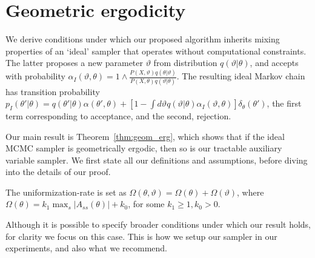 \newpage
\section{Geometric ergodicity}
We derive conditions under which our proposed algorithm
inherits mixing properties of an `ideal' sampler that operates without
computational constraints. The latter proposes a new parameter $\vartheta$
from distribution $q(\vartheta|\theta)$, and accepts with probability
$\alpha_I(\vartheta,\theta) = 1 \wedge \frac{P(X , \vartheta)q(\theta| \vartheta)}
      {P(X , \theta)q(\vartheta|\theta)}$. The resulting ideal
Markov chain has transition probability
$p_I(\theta'|\theta) = q(\theta'|\theta)\alpha(\theta',\theta) + \left[1-\int d\vartheta
q(\vartheta|\theta)\alpha_I(\vartheta,\theta)\right]\delta_\theta(\theta')$, the first
term corresponding to acceptance, and the second, rejection.

Our main result is Theorem~\ref{thm:geom_erg}, which shows that if the ideal MCMC
sampler is geometrically ergodic, then so is our tractable auxiliary
variable sampler. 
We first state all our definitions and assumptions, before diving into the details
of our proof.
\begin{assumption}
The uniformization-rate is set as $\Omega(\theta, \vartheta) = \Omega(\theta) + 
\Omega(\vartheta)$, where %
$\Omega(\theta) = k_1 \max_s |A_{ss}(\theta)| + k_0$, for some 
$k_1 \ge 1, k_0 > 0$.
\label{def:poisson-rate}
\end{assumption}
Although it is possible to specify broader conditions under which our 
result holds, for clarity we focus on this case. This is how we 
setup our sampler in our experiments, and also what we recommend.

